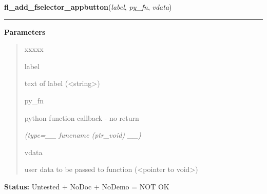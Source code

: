     \vspace{0.5ex}

\hspace{.8\funcindent}\begin{boxedminipage}{\funcwidth}

    \raggedright \textbf{fl\_add\_fselector\_appbutton}(\textit{label}, \textit{py\_fn}, \textit{vdata})

    \vspace{-1.5ex}

    \rule{\textwidth}{0.5\fboxrule}
\setlength{\parskip}{2ex}
\setlength{\parskip}{1ex}
      \textbf{Parameters}
      \vspace{-1ex}

      \begin{quote}
        \begin{Ventry}{xxxxx}

          \item[label]

          text of label ({\textless}string{\textgreater})

          \item[py\_fn]

          python function callback - no return

            {\it (type=\_\_ funcname (ptr\_void) \_\_)}

          \item[vdata]

          user data to be passed to function ({\textless}pointer to 
          void{\textgreater})

        \end{Ventry}

      \end{quote}

\textbf{Status:} Untested + NoDoc + NoDemo = NOT OK



    \end{boxedminipage}

    \label{xformslib:library:fl_remove_fselector_appbutton}

    \vspace{0.5ex}

